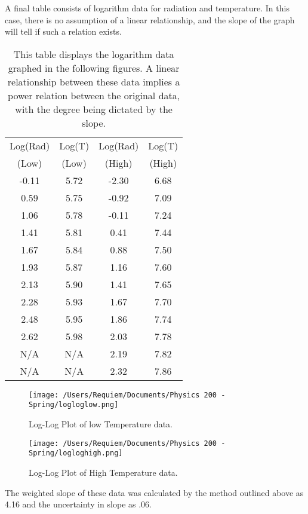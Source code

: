 \documentclass[aps,pre,twocolumn,nofootinbib]{revtex4}
\begin{document}
A final table consists of logarithm data for radiation and temperature.  In this case, there is no assumption of a linear relationship, and the slope of the graph will tell if such a relation exists.  
\begin{table}[h]
	\caption{This table displays the logarithm data graphed in the following figures.  A linear relationship between these data implies a power relation between the original data, with the degree being dictated by the slope.}
	\begin{ruledtabular}
	\begin{tabular}{cccc} 
	Log(Rad) & Log(T) & Log(Rad) & Log(T)\\
	(Low) & (Low) & (High) & (High)\\ \hline
	-0.11 & 5.72 & -2.30 & 6.68\\
	0.59 & 5.75 & -0.92 & 7.09\\
	1.06 & 5.78 & -0.11 & 7.24\\
	1.41 & 5.81 & 0.41 & 7.44\\
	1.67 & 5.84 & 0.88 & 7.50\\
	1.93 & 5.87 & 1.16 & 7.60\\
	2.13 & 5.90 & 1.41 & 7.65\\
	2.28 & 5.93 & 1.67 & 7.70\\
	2.48 & 5.95 & 1.86 & 7.74\\
	2.62 & 5.98 & 2.03 & 7.78\\
	N/A & N/A & 2.19 & 7.82\\
	N/A & N/A & 2.32 & 7.86\\
	\end{tabular}
	\end{ruledtabular}
	\label{Logs}
\end{table}

\begin{figure}[h]
\centering
\texttt{[image: /Users/Requiem/Documents/Physics 200 - Spring/logloglow.png]} 
\caption{Log-Log Plot of low Temperature data. }
\label{lowt}
\end{figure}

\begin{figure}[h]
\centering
\texttt{[image: /Users/Requiem/Documents/Physics 200 - Spring/logloghigh.png]} 
\caption{Log-Log Plot of High Temperature data. }
\label{hight}
\end{figure}

The weighted slope of these data was calculated by the method outlined above as 4.16 and the uncertainty in slope as .06.
\end{document}
